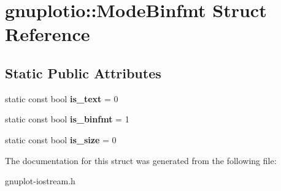 \hypertarget{structgnuplotio_1_1ModeBinfmt}{}\section{gnuplotio\+:\+:Mode\+Binfmt Struct Reference}
\label{structgnuplotio_1_1ModeBinfmt}
\subsection*{Static Public Attributes}
\begin{DoxyCompactItemize}
\item 
\mbox{\label{structgnuplotio_1_1ModeBinfmt_a7ab187fe922cac23b0d39ade81e5eb56}} 
static const bool {\bfseries is\+\_\+text} = 0
\item 
\mbox{\label{structgnuplotio_1_1ModeBinfmt_ab0d5d3718364cdea0347f93ec121d841}} 
static const bool {\bfseries is\+\_\+binfmt} = 1
\item 
\mbox{\label{structgnuplotio_1_1ModeBinfmt_a40a5a8ee815d6a5e9a3c30c8290a6967}} 
static const bool {\bfseries is\+\_\+size} = 0
\end{DoxyCompactItemize}


The documentation for this struct was generated from the following file\+:\begin{DoxyCompactItemize}
\item 
gnuplot-\/iostream.\+h\end{DoxyCompactItemize}

